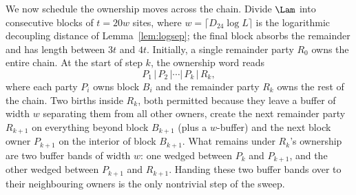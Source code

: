\begin{inwords}
We now schedule the ownership moves across the chain. Divide $\Lam$ into
consecutive blocks of $t=20w$ sites, where $w=\lceil D_{24}\log L\rceil$ is
the logarithmic decoupling distance of Lemma~\ref{lem:logsep}; the final
block absorbs the remainder and has length between $3t$ and $4t$. Initially,
a single remainder party $R_0$ owns the entire chain. At the start of step $k$,
the ownership word reads
\[
 P_1\,|\,P_2\,|\cdots|\,P_k\,|\,R_k ,
\]
where each party $P_i$ owns block $B_i$ and the remainder party $R_k$ owns
the rest of the chain. Two births inside $R_k$, both permitted because they
leave a buffer of width $w$ separating them from all other owners, create
the next remainder party $R_{k+1}$ on everything beyond block $B_{k+1}$
(plus a $w$-buffer) and the next block owner $P_{k+1}$ on the interior of
block $B_{k+1}$. What remains under $R_k$'s ownership are two buffer bands of
width $w$: one wedged between $P_k$ and $P_{k+1}$, and the other wedged
between $P_{k+1}$ and $R_{k+1}$. Handing these two buffer bands over to
their neighbouring owners is the only nontrivial step of the sweep.


\end{inwords}
